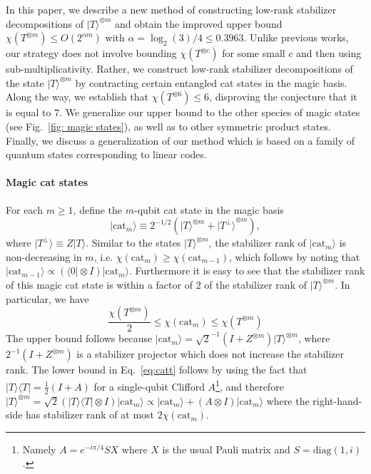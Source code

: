 \documentclass[a4paper,onecolumn,11pt,accepted=2021-11-11]{quantumarticle}
\newcommand{\cat}{\text{cat}}
\newcommand{\ket}[1]{\ensuremath{\lvert #1 \rangle}}
\newcommand{\bra}[1]{\ensuremath{\langle #1 \rvert}}
\newcommand{\csize}{c}
\begin{document}
In this paper, we describe a new method of constructing low-rank stabilizer decompositions of $\ket{T}^{\otimes m}$ and obtain the improved upper bound $\chi(T^{\otimes m})\leq O(2^{\alpha m})$ with $\alpha = \log_2(3)/4 \leq 0.3963$. Unlike previous works, our strategy does not involve bounding $\chi(T^{\otimes \csize})$ for some small $\csize$ and then using sub-multiplicativity. Rather, we construct low-rank stabilizer decompositions of the state $\ket{T}^{\otimes m}$ by contracting certain entangled cat states in the magic basis.  Along the way, we establish that $\chi(T^{\otimes 6}) \leq 6$, disproving the conjecture that it is equal to $7$. We generalize our upper bound to the other species of magic states (see Fig.~\ref{fig: magic states}), as well as to other symmetric product states. Finally, we discuss a generalization of our method which is based on a family of quantum states corresponding to linear codes.
\paragraph{Magic cat states} For each $m\geq 1$,  define the $m$-qubit cat state in the magic basis 
\begin{equation}
\ket{\cat_m} \equiv 2^{-1/2}(\ket{T}^{\otimes m} + \ket{T^\perp}^{\otimes m}),
\label{eq:magiccat}
\end{equation}
where $\ket{T^\perp} \equiv Z\ket{T}$. Similar to the states $\ket{T}^{\otimes m}$, the stabilizer rank of $\ket{\cat_m}$ is non-decreasing in $m$, i.e. $\chi(\cat_m) \geq \chi(\cat_{m-1})$, which follows by noting that $\ket{\cat_{m-1}} \propto (\bra{0} \otimes I) \ket{\cat_m}$. Furthermore it is easy to see that the stabilizer rank of this magic cat state is within a factor of $2$ of the stabilizer rank of $\ket{T}^{\otimes m}$. In particular, we have
\begin{equation}
\frac{\chi(T^{\otimes m})}{2} \leq \chi(\cat_m)\leq \chi(T^{\otimes m})
\label{eq:catt}
\end{equation}
The upper bound follows because $\ket{\cat_m} =\sqrt{2}^{-1} (I + Z^{\otimes m})\ket{T}^{\otimes m}$, where $2^{-1}(I + Z^{\otimes m})$ is a stabilizer projector which does not increase the stabilizer rank. The lower bound in Eq.~\eqref{eq:catt} follows by using the fact that $\ket{T}\bra{T} = \frac{1}{2}(I + A)$ for a single-qubit Clifford $A$\footnote{Namely $ A= e^{-i\pi/4} S X$ where $X$ is the usual Pauli matrix and $S = \text{diag}(1,i)$.}, and therefore $\ket{T}^{\otimes m} = \sqrt{2} (\ket{T}\bra{T}\otimes I)\ket{\cat_m} \propto \ket{\cat_m}+(A \otimes I)\ket{\cat_m}$ where the right-hand-side has stabilizer rank of at most $2\chi(\cat_m)$.
\end{document}
